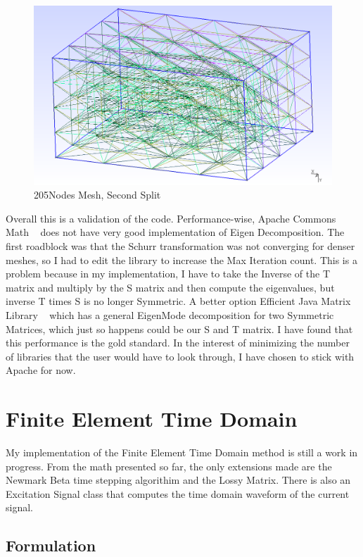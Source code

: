 \documentclass[11pt,a4paper,oldfontcommands]{memoir}
\begin{document}
\begin{figure}
  \includegraphics[width=\linewidth]{205Nodes.PNG}
  \caption{205Nodes Mesh, Second Split}
  \label{fig:mesh10}
\end{figure}


Overall this is a validation of the code. Performance-wise, Apache Commons Math ~\cite{ApacheMathCommon} does not have very good implementation of Eigen Decomposition. The first roadblock was that the Schurr transformation was not converging for denser meshes, so I had to edit the library to increase the Max Iteration count. This is a problem because in my implementation, I have to take the Inverse of the T matrix and multiply by the S matrix and then compute the eigenvalues, but inverse T times S is no longer Symmetric. A better option Efficient Java Matrix Library ~\cite{EJML} which has a general EigenMode decomposition for two Symmetric Matrices, which just so happens could be our S and T matrix. I have found that this performance is the gold standard. In the interest of minimizing the number of libraries that the user would have to look through, I have chosen to stick with Apache for now.

\chapter{Finite Element Time Domain}

My implementation of the Finite Element Time Domain method is still a work in progress. From the math presented so far, the only extensions made are the Newmark Beta time stepping algorithim and the Lossy Matrix. There is also an Excitation Signal class that computes the time domain waveform of the current signal.

\section{Formulation}
\end{document}
